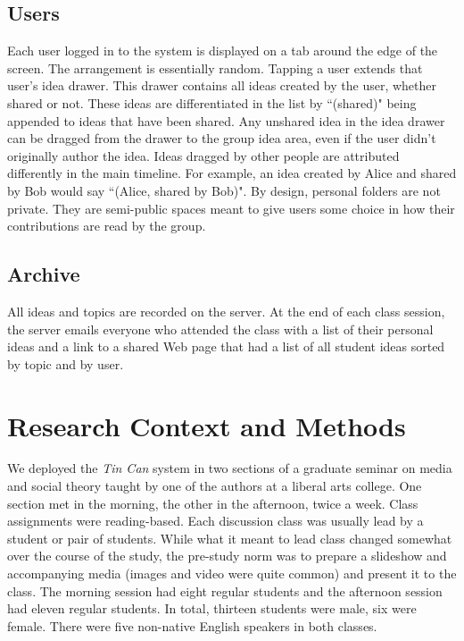\subsection{Users}
Each user logged in to the system is displayed on a tab around the edge of the screen. The arrangement is essentially random. Tapping a user extends that user's idea drawer. This drawer contains all ideas created by the user, whether shared or not. These ideas are differentiated in the list by ``(shared)" being appended to ideas that have been shared. Any unshared idea in the idea drawer can be dragged from the drawer to the group idea area, even if the user didn't originally author the idea. Ideas dragged by other people are attributed differently in the main timeline. For example, an idea created by Alice and shared by Bob would say ``(Alice, shared by Bob)". By design, personal folders are not private.  They are semi-public spaces meant to give users some choice in how their contributions are read by the group.

\subsection{Archive}
All ideas and topics are recorded on the server. At the end of each class session, the server emails everyone who attended the class with a list of their personal ideas and a link to a shared Web page that had a list of all student ideas sorted by topic and by user.



\section{Research Context and Methods}
We deployed the \emph{Tin Can} system in two sections of a graduate seminar on media and social theory taught by one of the authors at a liberal arts college. One section met in the morning, the other in the afternoon, twice a week. Class assignments were reading-based. Each discussion class was usually lead by a student or pair of students. While what it meant to lead class changed somewhat over the course of the study, the pre-study norm was to prepare a slideshow and accompanying media (images and video were quite common) and present it to the class. The morning session had eight regular students and the afternoon session had eleven regular students. In total, thirteen students were male, six were female. There were five non-native English speakers in both classes. 

